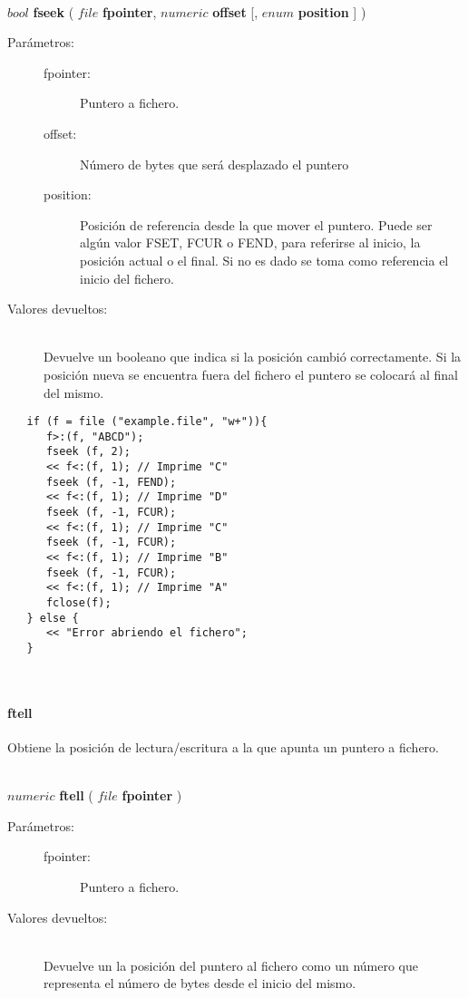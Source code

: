 \hfill \\ $bool$ \textbf{fseek} ( $file$ \textbf{fpointer}, $numeric$ \textbf{offset} [, $enum$ \textbf{position} ]  )  
\begin{description}
\item [Parámetros:] \hfill 
   \begin{description}
   \item[fpointer:] Puntero a fichero. 
   \item[offset:] Número de bytes que será desplazado el puntero
   \item[position:] Posición de referencia desde la que mover el puntero. Puede ser algún valor 
   FSET, FCUR o FEND, para referirse al inicio, la posición actual o el final. Si no es dado se
   toma como referencia el inicio del fichero.
   \end{description}
\item[Valores devueltos:] \hfill \\
   Devuelve un booleano que indica si la posición cambió correctamente. Si la posición 
   nueva se encuentra fuera del fichero el puntero se colocará al final del mismo.
\end{description}

\begin{lstlisting}  
   if (f = file ("example.file", "w+")){
      f>:(f, "ABCD");
      fseek (f, 2);
      << f<:(f, 1); // Imprime "C"
      fseek (f, -1, FEND);
      << f<:(f, 1); // Imprime "D"
      fseek (f, -1, FCUR);
      << f<:(f, 1); // Imprime "C"
      fseek (f, -1, FCUR);
      << f<:(f, 1); // Imprime "B"
      fseek (f, -1, FCUR);
      << f<:(f, 1); // Imprime "A"
      fclose(f);
   } else {
      << "Error abriendo el fichero";
   }
\end{lstlisting}
\hfill\\ 

\paragraph{ftell}
Obtiene la posición de lectura/escritura a la que apunta un puntero a fichero.

\hfill \\ $numeric$ \textbf{ftell} ( $file$ \textbf{fpointer}  )  
\begin{description}
\item [Parámetros:] \hfill 
   \begin{description}
   \item[fpointer:] Puntero a fichero. 
   \end{description}
\item[Valores devueltos:] \hfill \\
   Devuelve un la posición del puntero al fichero como un número que representa el
   número de bytes desde el inicio del mismo. 
\end{description}

